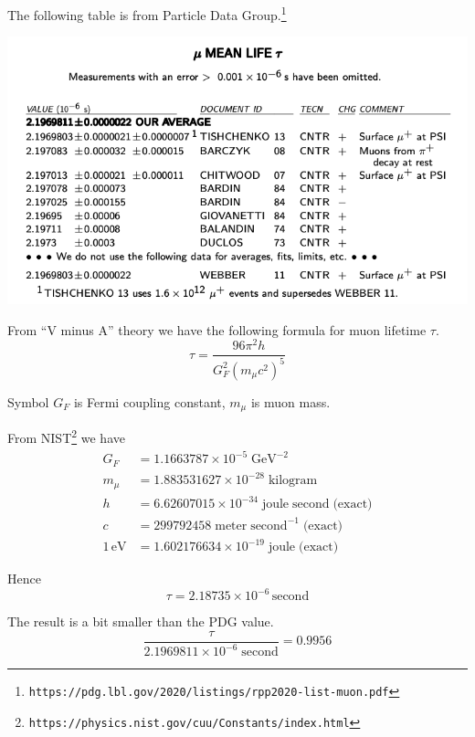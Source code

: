 \documentclass[12pt]{article}
\begin{document}
\noindent
The following table is from Particle Data Group.\footnote{\tt https://pdg.lbl.gov/2020/listings/rpp2020-list-muon.pdf}

\begin{center}
\includegraphics[scale=0.5]{muon-mean-life.png}
\end{center}

\noindent
From ``V minus A'' theory we have the following formula for muon lifetime $\tau$.
\begin{equation*}
\tau=\frac{96\pi^2h}{G_F^2\left(m_\mu c^2\right)^5}
\end{equation*}

\noindent
Symbol $G_F$ is Fermi coupling constant, $m_\mu$ is muon mass.

\bigskip
\noindent
From NIST\footnote{\tt https://physics.nist.gov/cuu/Constants/index.html} we have
\begin{align*}
G_F&=1.1663787\times10^{-5}\;\text{GeV}^{-2}
\\
m_\mu&=1.883531627\times10^{-28}\;\text{kilogram}
\\
h&=6.62607015\times10^{-34}\;\text{joule}\;\text{second}\;\text{(exact)}
\\
c&=299792458\;\text{meter}\;\text{second}^{-1}\;\text{(exact)}
\\
1\,\text{eV}&=1.602176634\times10^{-19}\;\text{joule}\;\text{(exact)}
\end{align*}

\noindent
Hence
\begin{equation*}
\tau=2.18735\times10^{-6}\,\text{second}
\end{equation*}

\noindent
The result is a bit smaller than the PDG value.
\begin{equation*}
\frac{\tau}{2.1969811\times10^{-6}\;\text{second}}=0.9956
\end{equation*}
\end{document}
